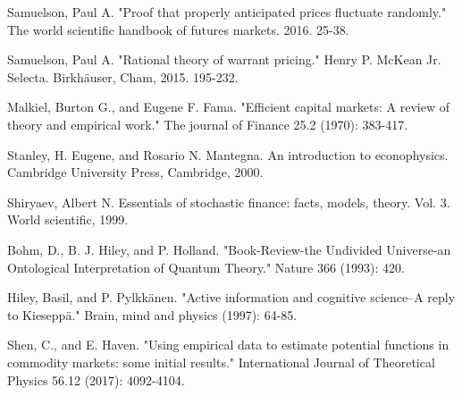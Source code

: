 \documentclass[a4paper,titlepage,12pt,fleqn,oneside]{report}
\begin{document}
\begin{thebibliography}{99}
\begin{LTRitems}
	Samuelson, Paul A. "Proof that properly anticipated prices fluctuate randomly." The world scientific handbook of futures markets. 2016. 25-38.
\end{LTRitems}

\begin{LTRitems}
	Samuelson, Paul A. "Rational theory of warrant pricing." Henry P. McKean Jr. Selecta. Birkhäuser, Cham, 2015. 195-232.
\end{LTRitems}

\begin{LTRitems}
	Malkiel, Burton G., and Eugene F. Fama. "Efficient capital markets: A review of theory and empirical work." The journal of Finance 25.2 (1970): 383-417.
\end{LTRitems}

\begin{LTRitems}
	Stanley, H. Eugene, and Rosario N. Mantegna. An introduction to econophysics. Cambridge University Press, Cambridge, 2000.
\end{LTRitems}

\begin{LTRitems}
	Shiryaev, Albert N. Essentials of stochastic finance: facts, models, theory. Vol. 3. World scientific, 1999.
\end{LTRitems}

\begin{LTRitems}
	Bohm, D., B. J. Hiley, and P. Holland. "Book-Review-the Undivided Universe-an Ontological Interpretation of Quantum Theory." Nature 366 (1993): 420.	
\end{LTRitems}

\begin{LTRitems}
	Hiley, Basil, and P. Pylkkänen. "Active information and cognitive science–A reply to Kieseppä." Brain, mind and physics (1997): 64-85.
\end{LTRitems}


\begin{LTRitems}
	Shen, C., and E. Haven. "Using empirical data to estimate potential functions in commodity markets: some initial results." International Journal of Theoretical Physics 56.12 (2017): 4092-4104.
\end{LTRitems}

\begin{LTRitems}
	\bibitem{}
	
\end{LTRitems}


\end{thebibliography}
\end{document}
